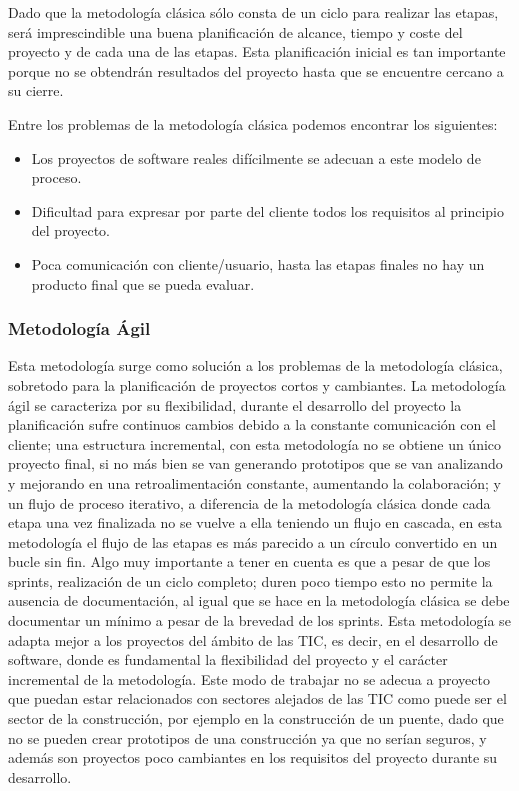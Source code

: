 Dado que la metodología clásica sólo consta de un ciclo para realizar las etapas, será imprescindible una buena planificación de alcance, tiempo y coste del proyecto y de cada una de las etapas. Esta planificación inicial es tan importante porque no se obtendrán resultados del proyecto hasta que se encuentre cercano a su cierre.

Entre los problemas de la metodología clásica podemos encontrar los siguientes:

\begin{itemize}
    \item Los proyectos de software reales difícilmente se adecuan a este modelo de proceso.
    \item Dificultad para expresar por parte del cliente todos los requisitos al principio del proyecto.
    \item Poca comunicación con cliente/usuario, hasta las etapas finales no hay un producto final que se pueda evaluar.
\end{itemize}


\subsubsection{Metodología Ágil}

Esta metodología surge como solución a los problemas de la metodología clásica, sobretodo para la planificación de proyectos cortos y cambiantes. La metodología ágil se caracteriza por su flexibilidad, durante el desarrollo del proyecto la planificación sufre continuos cambios debido a la constante comunicación con el cliente; una estructura incremental, con esta metodología no se obtiene un único proyecto final, si no más bien se van generando prototipos que se van analizando y mejorando en una retroalimentación constante, aumentando la colaboración; y un flujo de proceso iterativo, a diferencia de la metodología clásica donde cada etapa una vez finalizada no se vuelve a ella teniendo un flujo en cascada, en esta metodología el flujo de las etapas es más parecido a un círculo convertido en un bucle sin fin. Algo muy importante a tener en cuenta es que a pesar de que los sprints, realización de un ciclo completo; duren poco tiempo esto no permite la ausencia de documentación, al igual que se hace en la metodología clásica se debe documentar un mínimo a pesar de la brevedad de los sprints. Esta metodología se adapta mejor a los proyectos del ámbito de las TIC, es decir, en el desarrollo de software, donde es fundamental la flexibilidad del proyecto y el carácter incremental de la metodología. Este modo de trabajar no se adecua a proyecto que puedan estar relacionados con sectores alejados de las TIC como puede ser el sector de la construcción, por ejemplo en la construcción de un puente, dado que no se pueden crear prototipos de una construcción ya que no serían seguros, y además son proyectos poco cambiantes en los requisitos del proyecto durante su desarrollo.

